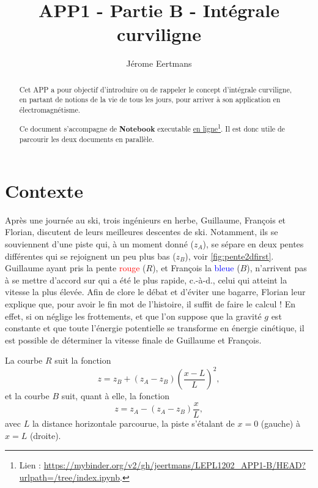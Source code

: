 \documentclass{cup-pan}
\author{Jérome Eertmans}
\title{APP1 - Partie B - Intégrale curviligne}
\date{}
\begin{document}
\maketitle

\begin{abstract}

Cet APP a pour objectif d'introduire ou de rappeler le concept d'intégrale curviligne, en partant de notions de la vie de tous les jours, pour arriver à son application en électromagnétisme.

Ce document s'accompagne de \textbf{Notebook} executable \href{https://mybinder.org/v2/gh/jeertmans/LEPL1202_APP1-B/HEAD?urlpath=/tree/index.ipynb}{en ligne}\footnote{Lien : \url{https://mybinder.org/v2/gh/jeertmans/LEPL1202_APP1-B/HEAD?urlpath=/tree/index.ipynb}.}. Il est donc utile de parcourir les deux documents en parallèle.


\end{abstract}

\section{Contexte}

Après une journée au ski, trois ingénieurs en herbe, Guillaume, François et Florian, discutent de leurs meilleures descentes de ski. Notamment, ils se souviennent d'une piste qui, à un moment donné ($z_A$), se sépare en deux pentes différentes qui se rejoignent un peu plus bas ($z_B$), voir \autoref{fig:pente2dfirst}. Guillaume ayant pris la pente \textcolor{red}{rouge} ($R$), et François la \textcolor{blue}{bleue} ($B$), n'arrivent pas à se mettre d'accord sur qui a été le plus rapide, c.-à-d., celui qui atteint la vitesse la plus élevée. Afin de clore le débat et d'éviter une bagarre, Florian leur explique que, pour avoir le fin mot de l'histoire, il suffit de faire le calcul ! En effet, si on néglige les frottements, et que l'on suppose que la gravité $g$ est constante et que toute l'énergie potentielle se transforme en énergie cinétique, il est possible de déterminer la vitesse finale de Guillaume et François.

La courbe $R$ suit la fonction
\begin{equation}
    z = z_B + (z_A - z_B)\left(\frac{x-L}{L}\right)^2,
\end{equation}
et la courbe $B$ suit, quant à elle, la fonction
\begin{equation}
    z = z_A - (z_A - z_B)\frac{x}{L},
\end{equation}
avec $L$ la distance horizontale parcourue, la piste s'étalant de $x=0$ (gauche) à $x=L$ (droite).
\end{document}
